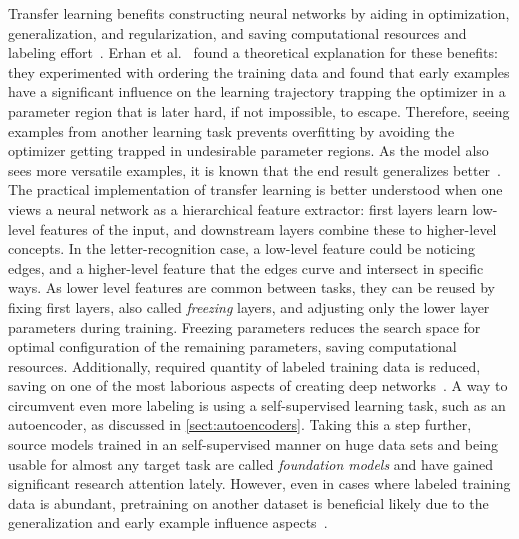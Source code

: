 \documentclass[english,twoside,openright]{UH_DS_MSc}
\begin{document}
Transfer learning benefits constructing neural networks 
by aiding in optimization, generalization, and regularization, and saving computational resources and labeling effort~\cite{erhanWhyDoesUnsupervised2010, transferlearning_survey}.
Erhan et al.~\cite{erhanWhyDoesUnsupervised2010} found a theoretical explanation for these benefits: they
experimented with ordering the training data and found 
that early examples have a significant influence on the learning trajectory trapping the optimizer in a parameter region that is later hard, 
if not impossible, to escape. Therefore, seeing examples from another learning task prevents overfitting by avoiding the optimizer getting trapped in undesirable parameter regions. As the model also sees more versatile examples, it is known that the end result generalizes better~\cite{transferlearning_survey}.
The practical implementation of transfer learning is better understood when one views a neural network as a hierarchical feature extractor:
first layers learn low-level features of the input, and downstream layers combine these to higher-level concepts.
In the letter-recognition case, a low-level feature could be noticing edges, and a higher-level feature that the edges curve and intersect in 
specific ways. As lower level features are common between tasks, they can be reused by fixing first layers, also called \textit{freezing} layers,
and adjusting only the lower layer parameters during training.
Freezing parameters reduces the search space for optimal configuration of the remaining parameters, saving computational resources. Additionally, required quantity of labeled training data is reduced, saving on one of the most laborious aspects of creating deep networks~\cite{engbook}.
A way to circumvent even more labeling is using a self-supervised learning task, such as an autoencoder, as discussed in \ref{sect:autoencoders}. Taking this a step further, source models trained in an self-supervised manner on huge data sets and being usable for almost any target task are called \textit{foundation models} and have gained significant research attention lately. However, even in cases where labeled training data is abundant, pretraining on another dataset is beneficial likely due to the generalization and early example influence aspects~\cite{erhanWhyDoesUnsupervised2010}.
\end{document}
